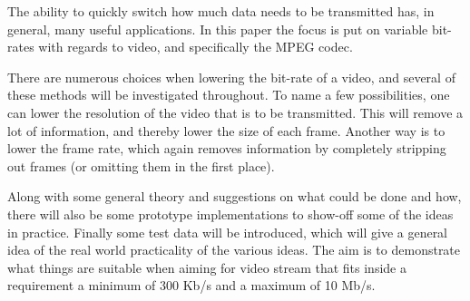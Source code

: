 The ability to quickly switch how much data needs to be transmitted has, in general, many useful applications. In this paper the focus is put on variable bit-rates with regards to video, and specifically the MPEG codec.

There are numerous choices when lowering the bit-rate of a video, and several of these methods will be investigated throughout. To name a few possibilities, one can lower the resolution of the video that is to be transmitted. This will remove a lot of information, and thereby lower the size of each frame. Another way is to lower the frame rate, which again removes information by completely stripping out frames (or omitting them in the first place).

Along with some general theory and suggestions on what could be done and how, there will also be some prototype implementations to show-off some of the ideas in practice. Finally some test data will be introduced, which will give a general idea of the real world practicality of the various ideas. The aim is to demonstrate what things are suitable when aiming for video stream that fits inside a requirement a minimum of 300 Kb/s and a maximum of 10 Mb/s.
